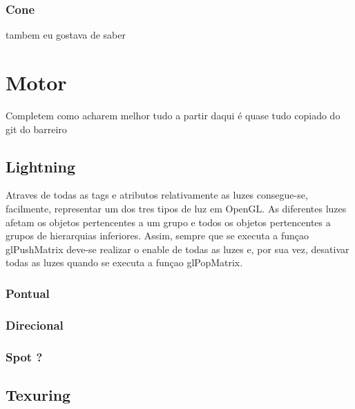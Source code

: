 \documentclass{article}
\begin{document}
\subsubsection{ Cone } 
tambem eu gostava de saber

\section{Motor}
Completem como acharem melhor tudo a partir daqui é quase tudo copiado do git do barreiro
\subsection{Lightning}

Atraves de todas as tags e atributos relativamente as luzes consegue-se, facilmente, representar um dos tres tipos de luz em OpenGL.
As diferentes luzes afetam os objetos pertencentes a um grupo e todos os objetos pertencentes a grupos de hierarquias inferiores. Assim, sempre que se executa a funçao glPushMatrix deve-se realizar o enable de todas as luzes e, por sua vez, desativar todas as luzes quando se executa a funçao glPopMatrix.

\subsubsection{Pontual}

\subsubsection{Direcional}

\subsubsection{Spot ?}

\subsection{Texuring}
\end{document}
